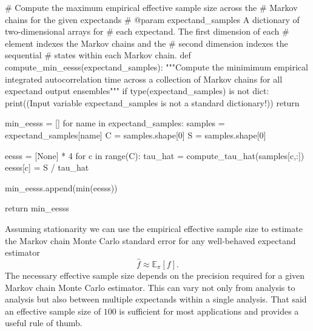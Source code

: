 \documentclass[
  letterpaper,
  DIV=11,
  numbers=noendperiod]{scrartcl}
\newenvironment{Shaded}{\begin{snugshade}}{\end{snugshade}}
\newcommand{\BuiltInTok}[1]{\textcolor[rgb]{0.00,0.23,0.31}{#1}}
\newcommand{\CommentTok}[1]{\textcolor[rgb]{0.37,0.37,0.37}{#1}}
\newcommand{\ControlFlowTok}[1]{\textcolor[rgb]{0.00,0.23,0.31}{#1}}
\newcommand{\DecValTok}[1]{\textcolor[rgb]{0.68,0.00,0.00}{#1}}
\newcommand{\KeywordTok}[1]{\textcolor[rgb]{0.00,0.23,0.31}{#1}}
\newcommand{\NormalTok}[1]{\textcolor[rgb]{0.00,0.23,0.31}{#1}}
\newcommand{\OperatorTok}[1]{\textcolor[rgb]{0.37,0.37,0.37}{#1}}
\newcommand{\StringTok}[1]{\textcolor[rgb]{0.13,0.47,0.30}{#1}}
\newcommand{\VariableTok}[1]{\textcolor[rgb]{0.07,0.07,0.07}{#1}}
\begin{document}
\begin{Shaded}
\begin{Highlighting}[]
\CommentTok{\# Compute the maximum empirical effective sample size across the }
\CommentTok{\# Markov chains for the given expectands}
\CommentTok{\# @param expectand\_samples A dictionary of two{-}dimensional arrays for}
\CommentTok{\#                          each expectand.  The first dimension of each}
\CommentTok{\#                          element indexes the Markov chains and the }
\CommentTok{\#                          second dimension indexes the sequential }
\CommentTok{\#                          states within each Markov chain.}
\KeywordTok{def}\NormalTok{ compute\_min\_eesss(expectand\_samples):}
  \CommentTok{"""Compute the minimimum empirical integrated autocorrelation time}
\CommentTok{     across a collection of Markov chains for all expectand output}
\CommentTok{     ensembles"""}
  \ControlFlowTok{if} \BuiltInTok{type}\NormalTok{(expectand\_samples) }\KeywordTok{is} \KeywordTok{not} \BuiltInTok{dict}\NormalTok{:}
    \BuiltInTok{print}\NormalTok{((}\StringTok{\textquotesingle{}Input variable \textasciigrave{}expectand\_samples\textasciigrave{} \textquotesingle{}}
           \StringTok{\textquotesingle{}is not a standard dictionary!\textquotesingle{}}\NormalTok{))}
    \ControlFlowTok{return}
      
\NormalTok{  min\_eesss }\OperatorTok{=}\NormalTok{ []}
  \ControlFlowTok{for}\NormalTok{ name }\KeywordTok{in}\NormalTok{ expectand\_samples:}
\NormalTok{    samples }\OperatorTok{=}\NormalTok{ expectand\_samples[name]}
\NormalTok{    C }\OperatorTok{=}\NormalTok{ samples.shape[}\DecValTok{0}\NormalTok{]}
\NormalTok{    S }\OperatorTok{=}\NormalTok{ samples.shape[}\DecValTok{0}\NormalTok{]}
    
\NormalTok{    eesss }\OperatorTok{=}\NormalTok{ [}\VariableTok{None}\NormalTok{] }\OperatorTok{*} \DecValTok{4}
    \ControlFlowTok{for}\NormalTok{ c }\KeywordTok{in} \BuiltInTok{range}\NormalTok{(C):}
\NormalTok{      tau\_hat }\OperatorTok{=}\NormalTok{ compute\_tau\_hat(samples[c,:])}
\NormalTok{      eesss[c] }\OperatorTok{=}\NormalTok{ S }\OperatorTok{/}\NormalTok{ tau\_hat}
    
\NormalTok{    min\_eesss.append(}\BuiltInTok{min}\NormalTok{(eesss))}
  
  \ControlFlowTok{return}\NormalTok{ min\_eesss}
\end{Highlighting}
\end{Shaded}

Assuming stationarity we can use the empirical effective sample size to
estimate the Markov chain Monte Carlo standard error for any
well-behaved expectand estimator \[
\hat{f} \approx \mathbb{E}_{\pi}[f].
\] The necessary effective sample size depends on the precision required
for a given Markov chain Monte Carlo estimator. This can vary not only
from analysis to analysis but also between multiple expectands within a
single analysis. That said an effective sample size of \(100\) is
sufficient for most applications and provides a useful rule of thumb.
\end{document}
